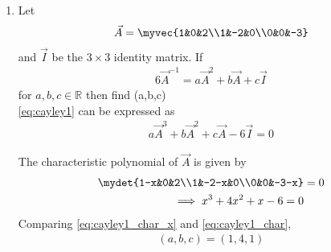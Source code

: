 \renewcommand{\theequation}{\theenumi}
\renewcommand{\thefigure}{\theenumi}
\begin{enumerate}[label=\thesection.\arabic*.,ref=\thesection.\theenumi]

\item Let
\begin{align}
\vec{A}=\myvec{1&0&2\\1&-2&0\\0&0&-3}
\end{align}
and $\vec{I}$ be the $3\times3$ identity matrix. If 
\begin{align}
6\vec{A}^{-1}=a\vec{A}^2+b\vec{A}+c\vec{I} \label{eq:cayley1}
\end{align} for $a,b,c \in \mathbb{R}$ then find (a,b,c)
\\
\solution \eqref{eq:cayley1} can be expressed as
\begin{align}
a\vec{A}^3+b\vec{A}^2+c\vec{A} 
-6\vec{I} = 0
\label{eq:cayley1_char}
\end{align} 

The characteristic polynomial of $\vec{A}$ is given by 
\begin{align}
\mydet{1-x&0&2\\1&-2-x&0\\0&0&-3-x} &=0
\\
\implies x^3 + 4x^2 + x - 6 = 0
\label{eq:cayley1_char_x}
\end{align}
Comparing \eqref{eq:cayley1_char_x} and \eqref{eq:cayley1_char},
\begin{align}
(a,b,c) = (1,4,1)
\end{align}



\end{enumerate}
